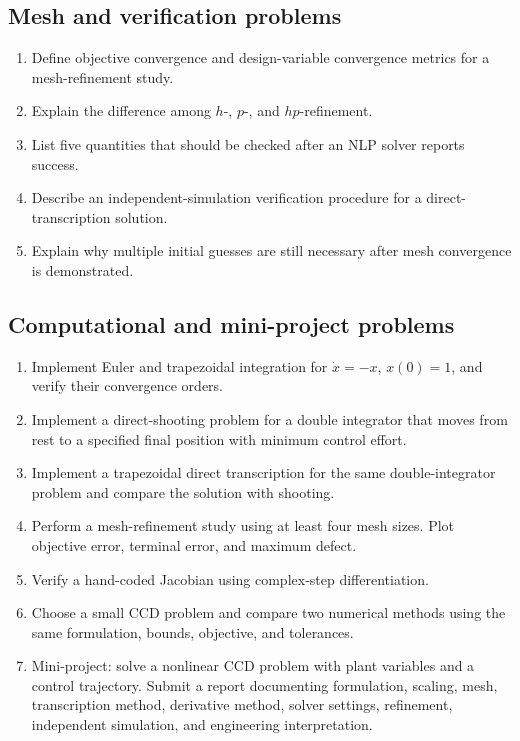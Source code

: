 \documentclass[11pt]{article}
\begin{document}
\subsection*{Mesh and verification problems}
\begin{enumerate}[leftmargin=1.5em,label=\textbf{P\arabic*.},resume]
  \item Define objective convergence and design-variable convergence metrics for a mesh-refinement study.
  \item Explain the difference among $h$-, $p$-, and $hp$-refinement.
  \item List five quantities that should be checked after an NLP solver reports success.
  \item Describe an independent-simulation verification procedure for a direct-transcription solution.
  \item Explain why multiple initial guesses are still necessary after mesh convergence is demonstrated.
\end{enumerate}

\subsection*{Computational and mini-project problems}
\begin{enumerate}[leftmargin=1.5em,label=\textbf{P\arabic*.},resume]
  \item Implement Euler and trapezoidal integration for $\dot{x}=-x$, $x(0)=1$, and verify their convergence orders.
  \item Implement a direct-shooting problem for a double integrator that moves from rest to a specified final position with minimum control effort.
  \item Implement a trapezoidal direct transcription for the same double-integrator problem and compare the solution with shooting.
  \item Perform a mesh-refinement study using at least four mesh sizes. Plot objective error, terminal error, and maximum defect.
  \item Verify a hand-coded Jacobian using complex-step differentiation.
  \item Choose a small CCD problem and compare two numerical methods using the same formulation, bounds, objective, and tolerances.
  \item Mini-project: solve a nonlinear CCD problem with plant variables and a control trajectory. Submit a report documenting formulation, scaling, mesh, transcription method, derivative method, solver settings, refinement, independent simulation, and engineering interpretation.
\end{enumerate}
\end{document}
